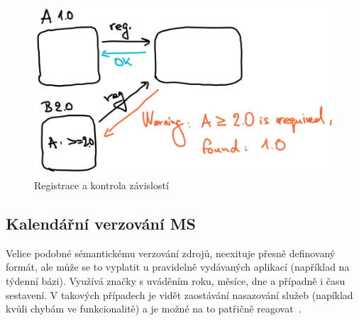 \begin{figure}[htbp]
   \centering
   \includegraphics[max width=\textwidth]{assets/draft-version-reg}
   \caption{Registrace  a kontrola závislostí}\label{fig:version-reg}
\end{figure}



\subsection{Kalendářní verzování MS}\label{subsec:msa-dependencies-calendar}

Velice podobné sémantickému verzování zdrojů, neexituje přesně definovaný formát, ale může se to vyplatit u pravidelně vydávaných aplikací (například na týdenní bázi).
Využívá značky s uváděním roku, měsíce, dne a případně i času sestavení.
V takových případech je vidět zaostávání nasazování služeb (napíklad kvůli chybám ve funkcionalitě) a je možné na to patřičně reagovat~\cite{msversions}.

\newpage
